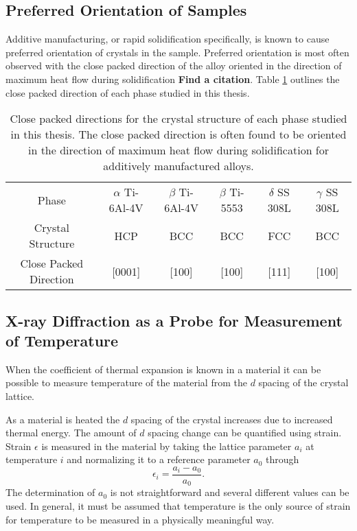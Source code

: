 \subsection{Preferred Orientation of Samples}
Additive manufacturing, or rapid solidification specifically, is known to cause preferred orientation of crystals in the sample. Preferred orientation is most often observed with the close packed direction of the alloy oriented in the direction of maximum heat flow during solidification \textbf{Find a citation}. Table \ref{orientation_directions} outlines the close packed direction of each phase studied in this thesis.

\begin{table}\caption{Close packed directions for the crystal structure of each phase studied in this thesis. The close packed direction is often found to be oriented in the direction of maximum heat flow during solidification for additively manufactured alloys.}
	\label{orientation_directions}
	\begin{center}
		\begin{tabular}{c|ccccc} \hline
		Phase & $\alpha$ Ti-6Al-4V & $\beta$ Ti-6Al-4V & $\beta$ Ti-5553 & $\delta$ SS 308L & $\gamma$ SS 308L \\
		Crystal Structure & HCP & BCC & BCC & FCC & BCC \\
		Close Packed Direction & [0001] & [100] & [100] & [111] & [100] \\
		\end{tabular}
	\end{center}
\end{table}

\subsection{X-ray Diffraction as a Probe for Measurement of Temperature}
When the coefficient of thermal expansion is known in a material it can be possible to measure temperature of the material from the $d$ spacing of the crystal lattice.

As a material is heated the $d$ spacing of the crystal increases due to increased thermal energy. The amount of $d$ spacing change can be quantified using strain. Strain $\epsilon$ is measured in the material by taking the lattice parameter $a_i$ at temperature $i$ and normalizing it to a reference parameter $a_0$ through
\begin{equation}
	\epsilon_i = \frac{a_i - a_0}{a_0}.
	\label{crystal_strain}
\end{equation}
The determination of $a_0$ is not straightforward and several different values can be used. In general, it must be assumed that temperature is the only source of strain for temperature to be measured in a physically meaningful way. 

